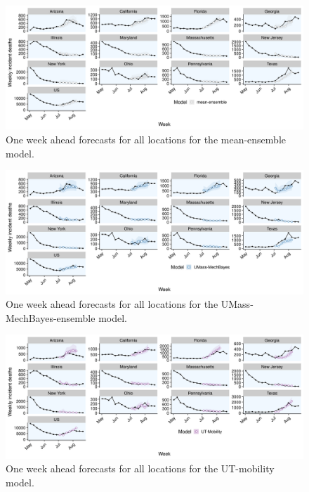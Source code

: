 \documentclass[
]{book}
\begin{document}
\begin{figure}
\includegraphics[width=1\linewidth]{../visualisation/chapter-5-results/scenario-baseline/APPENDIX-mean-ensemble-forecasts} \caption{One week ahead forecasts for all locations for the mean-ensemble model.}\label{fig:predictions-mean-ensemble}
\end{figure}

\begin{figure}
\includegraphics[width=1\linewidth]{../visualisation/chapter-5-results/scenario-baseline/APPENDIX-UMass-MechBayes-forecasts} \caption{One week ahead forecasts for all locations for the UMass-MechBayes-ensemble model.}\label{fig:predictions-umass-mechbayes}
\end{figure}

\begin{figure}
\includegraphics[width=1\linewidth]{../visualisation/chapter-5-results/scenario-baseline/APPENDIX-UT-Mobility-forecasts} \caption{One week ahead forecasts for all locations for the UT-mobility model.}\label{fig:predictions-ut-mobility}
\end{figure}
\end{document}
